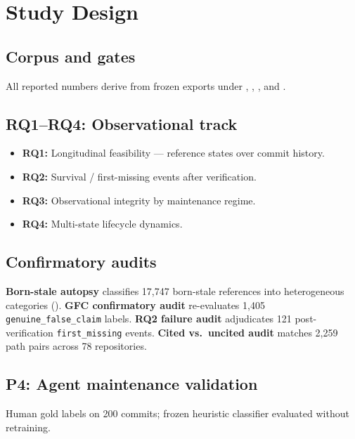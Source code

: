 \section{Study Design}
\label{sec:design}

\subsection{Corpus and gates}
All reported numbers derive from frozen exports under , , , and .

\subsection{RQ1--RQ4: Observational track}
\begin{itemize}
  \item \textbf{RQ1:} Longitudinal feasibility --- reference states over commit history.
  \item \textbf{RQ2:} Survival / first-missing events after verification.
  \item \textbf{RQ3:} Observational integrity by maintenance regime.
  \item \textbf{RQ4:} Multi-state lifecycle dynamics.
\end{itemize}

\subsection{Confirmatory audits}
\textbf{Born-stale autopsy} classifies 17{,}747 born-stale references into heterogeneous categories ().
\textbf{GFC confirmatory audit} re-evaluates 1{,}405 \texttt{genuine\_false\_claim} labels.
\textbf{RQ2 failure audit} adjudicates 121 post-verification \texttt{first\_missing} events.
\textbf{Cited vs.\ uncited audit} matches 2{,}259 path pairs across 78 repositories.

\subsection{P4: Agent maintenance validation}
Human gold labels on 200 commits; frozen heuristic classifier evaluated without retraining.

